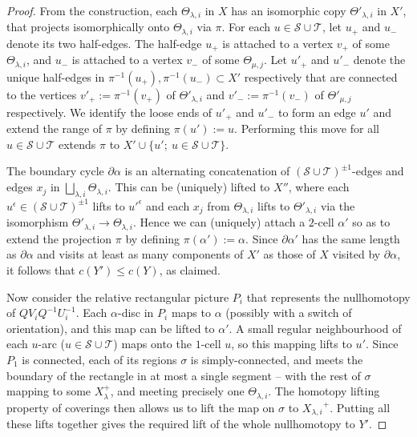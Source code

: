 \documentclass[12pt,a4paper]{amsart}
\def\a{\alpha}
\def\cS{\mathcal{S}}
\def\cT{\mathcal{T}}
\begin{document}
\begin{proof}
From the construction, each $\Theta_{\lambda,i}$ in $X$ has an isomorphic copy $\Theta'_{\lambda,i}$ in $X'$, that projects isomorphically onto $\Theta_{\lambda,i}$ via $\pi$.  
 For each $u\in \cS\cup\cT$, let $u_+$ and $u_-$ denote its two half-edges.  
 The half-edge $u_+$ is attached to a vertex $v_+$ of some $\Theta_{\lambda,i}$, and $u_-$ is attached to a vertex $v_-$ of some $\Theta_{\mu,j}$.   Let $u'_+$ and $u'_-$ denote the unique half-edges in $\pi^{-1}(u_+), \pi^{-1}(u_-)\subset X'$ respectively that are connected to the vertices $v'_+:=\pi^{-1}(v_+)$ of $\Theta'_{\lambda,i}$ and $v'_-:=\pi^{-1}(v_-)$ of $\Theta'_{\mu,j}$ respectively.   We identify the loose ends of $u'_+$ and $u'_-$ to form an edge $u'$ and extend the range of $\pi$ by defining $\pi(u'):=u$. Performing this move for all $u\in\cS\cup\cT$ extends $\pi$ to $X'\cup\{u';~u\in\cS\cup\cT\}$.



The boundary cycle $\partial\a$ is an alternating concatenation of $(\cS\cup\cT)^{\pm1}$-edges and edges $x_j$
in $\bigsqcup_{\lambda,i}\Theta_{\lambda,i}$.  This can be (uniquely) lifted to $X''$, where each $u^\epsilon\in(\cS\cup\cT)^{\pm1}$ lifts to ${u'}^\epsilon$ and each $x_j$ from $\Theta_{\lambda,i}$ lifts to $\Theta'_{\lambda,i}$ via the isomorphism $\Theta'_{\lambda,i}\to\Theta_{\lambda,i}$.  Hence we can (uniquely) attach a $2$-cell $\a'$ so as to extend the projection $\pi$ by defining $\pi(\a'):=\a$.   Since $\partial\a'$ has the same length as $\partial\a$ and visits at least as many components of $X'$ as those of $X$ visited by $\partial\a$, it follows that $c(Y')\le c(Y)$, as claimed.

Now consider the relative rectangular picture $P_i$ that represents the nullhomotopy of $QV_iQ^{-1}U_i^{-1}$.  Each $\a$-disc in $P_i$ maps to $\a$ (possibly with a switch of orientation), and this map can be lifted to $\a'$.   
A small regular neighbourhood of each $u$-arc ($u\in\cS\cup\cT$) maps onto the $1$-cell $u$, so this mapping lifts to $u'$.  
Since $P_1$ is connected, each of its regions $\sigma$ is simply-connected, and meets the boundary of the rectangle in at most a single segment 
-- with the rest of $\sigma$ mapping to some $X_\lambda^+$, and meeting precisely
one $\Theta_{\lambda,i}$.  
The homotopy lifting property of coverings then allows us to lift the map on $\sigma$ to ${X_{\lambda,i}}^+$.   Putting all these lifts together gives the required lift of the whole nullhomotopy to $Y'$.
\end{proof}
\end{document}

